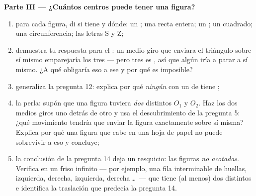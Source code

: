 \begin{problem}
\medskip
\noindent\textbf{Parte III --- ¿Cuántos centros puede tener una
figura?}
\begin{enumerate}[resume]
  \item para cada figura, di si tiene  y dónde: un ; una recta entera; un
        ; un cuadrado; una circunferencia; las letras S
        y Z;
  \item demuestra tu respuesta para el : un
        medio giro que enviara el triángulo sobre sí mismo emparejaría
        los tres  --- pero tres es , así que algún 
        iría a parar a sí mismo. ¿A qué obligaría eso a ese
         y por qué es imposible?
  \item generaliza la pregunta 12: explica por qué \emph{ningún} 
        con un  de  tiene ;
  \item la perla: supón que una figura tuviera \emph{dos}  distintos $O_1$ y $O_2$. Haz los dos
        medios giros uno detrás de otro y usa el descubrimiento de la
        pregunta 5: ¿qué movimiento tendría que enviar la figura exactamente
        sobre sí misma? Explica por qué una figura que cabe en una hoja
        de papel no puede sobrevivir a eso y concluye;
  \item la conclusión de la pregunta 14 deja un resquicio: las figuras
        \emph{no acotadas}. Verifica en un friso infinito
        --- por ejemplo, una fila interminable de huellas, izquierda, derecha,
        izquierda, derecha\,\dots\ --- que tiene (al menos) dos
         distintos e identifica la
        traslación que predecía la pregunta 14.
\end{enumerate}
\end{problem}
